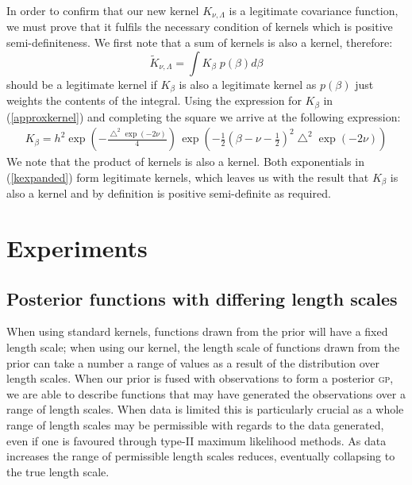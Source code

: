 \documentclass{article}
\renewcommand{\sc}[1]{{\scshape #1}}
\newcommand{\tK}{\tilde{K}}
\begin{document}
In order to confirm that our new kernel $K_{\nu,\Lambda}$ is a legitimate covariance function, we must prove that it fulfils the necessary condition of kernels which is positive semi-definiteness. We first note that a sum of kernels is also a kernel, therefore:
\begin{equation}
\tK_{\nu,\Lambda} = \int K_\beta \;p(\beta)d\beta
\end{equation}
should be a legitimate kernel if $K_\beta$ is also a legitimate kernel as $p(\beta)$ just weights the contents of the integral. Using the expression for $K_\beta$ in (\ref{approxkernel}) and completing the square we arrive at the following expression:
\begin{align}
K_{\beta} = h^2  \exp\left( -\frac{\bigtriangleup^2 \exp(-2\nu)}{4} \right) \,  \exp \left(  -\frac{1}{2} \left( \beta - \nu - \frac{1}{2} \right) ^ 2 \bigtriangleup^2 \exp(-2\nu)   \right) \label{kexpanded}
\end{align}
We note that the product of kernels is also a kernel. Both exponentials in (\ref{kexpanded}) form legitimate kernels, which leaves us with the result that $K_\beta$ is also a kernel and by definition is positive semi-definite as required.






\section{Experiments}



\subsection{Posterior functions with differing length scales}

When using standard kernels, functions drawn from the prior will have a fixed length scale; when using our kernel, the length scale of functions drawn from the prior can take a number a range of values as a result of the distribution over length scales. When our prior is fused with observations to form a posterior \sc{gp}, we are able to describe functions that may have generated the observations over a range of length scales. When data is limited this is particularly crucial as a whole range of length scales may be permissible with regards to the data generated, even if one is favoured through type-II maximum likelihood methods. As data increases the range of permissible length scales reduces, eventually collapsing to the true length scale.
\end{document}
